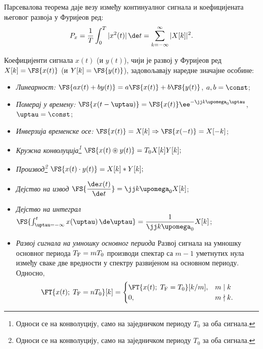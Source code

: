 \noindent 
Парсевалова теорема даје везу између  континуалног сигнала и коефицијената
његовог развоја у Фуријеов ред:
\begin{equation}
P_x = \dfrac{1}{T} \int_{0}^{T} |x^2(t)|\,\de t = \sum_{k=-\infty}^{\infty} |X[k]|^2. \label{eq:ctfs_parseval}
\end{equation}

Коефицијенти сигнала $x(t)$ (и $y(t)$), чији је развој у Фуријеов ред
$X[k] = \FS{x(t)}$ (и $Y[k] = \FS{y(t)}$),
задовољавају наредне значајне особине: 
\begin{itemize}\itemsep0pt
    \item \emph{Линеарност:}  $\FS{ax(t) + by(t)} = a \FS{x(t)} + b \FS{y(t)}$, $a,b = \const$; \hfill \Svojstvo \label{s:ctfs:lin}
    \item \emph{Померај у времену:} $ \FS{x(t-\uptau)} = \FS{x(t)} \ee^{-\jj k \upomega_{\rm 0} \uptau}$, $\uptau = \const$; \hfill \Svojstvo \label{s:ctfs:delay}
    \item \emph{Инверзија временске осе:} $\FS{x(t)} = X[k] \Rightarrow \FS{x(-t)} = X[-k] $; \hfill \Svojstvo
    \item \emph{Кружна конволуција\footnote{Односи се на конволуцију, само на заједничком периоду $T_0$ за оба сигнала.}} 
    $
    \FS{x(t) \circledast y(t)} = T_0 X[k] Y[k];
    $ \hfill \Svojstvo
    \item \emph{Производ\footnote{Односи се на конволуцију, само на заједничком периоду $T_0$ за оба сигнала.}}
    $
    \FS{x(t) \cdot y(t)} = X[k] \ast Y[k]; 
    $ \hfill \Svojstvo \label{s:ctfs:conv}
    \item \emph{Дејство на извод} $\FS{ \dfrac{\de x(t)}{\de t} } = \jj k \upomega_0 X[k]$; \hfill \Svojstvo
    \item \emph{Дејство на интеграл} $\FS{ \int_{\uptau = -\infty}^t x(\uptau) \, \de \uptau } = \dfrac{1}{\jj k \upomega_0} X[k]$; \hfill \Svojstvo
    \item \emph{Развој сигнала на умношку основног периода}
    Развој сигнала на умношку основног периода $T_{\rm F} = m T_0$ производи спектар са $m-1$ уметнутих нула између сваке 
    две вредности у спектру развијеном на основном периоду. Односно,
    \begin{equation}
        \FT{x(t); \;T_{\rm F} = nT_0}[k] = \begin{cases}
            \FT{x(t); \; T_{\rm F} = T_0 }[k/m] ,& m \mid k \\
            0, & m \nmid k.
        \end{cases} \label{s:ctfs:mT0}
    \end{equation} 
\end{itemize}


